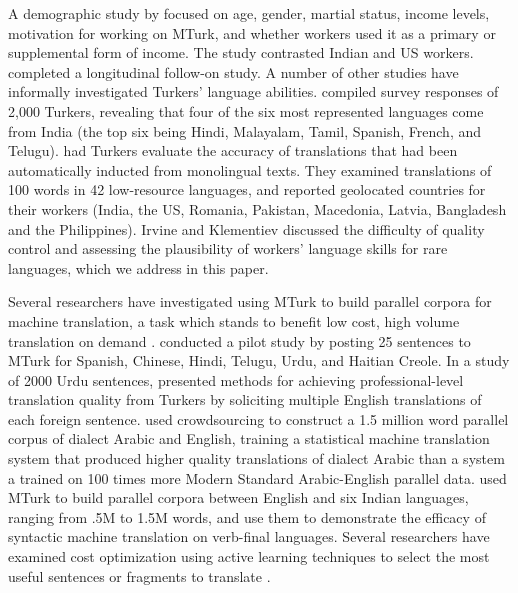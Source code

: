 \documentclass[11pt]{article}
\begin{document}
A demographic study by  focused on age, gender, martial status, income levels, motivation for working on MTurk, and whether workers used it as a primary or supplemental form of income.  The study contrasted Indian and US workers.  completed a longitudinal follow-on study. 
A number of other studies have informally investigated Turkers' language abilities.   compiled survey responses of 2,000 Turkers, revealing that four of the six most represented languages come from India (the top six being Hindi, Malayalam, Tamil, Spanish, French, and Telugu).   had Turkers evaluate the accuracy of translations that had been automatically inducted from monolingual texts.  They examined translations of 100 words in 42 low-resource languages, and reported geolocated countries for their workers (India, the US, Romania, Pakistan, Macedonia, Latvia, Bangladesh and the Philippines).  Irvine and Klementiev discussed the difficulty of quality control and assessing the plausibility of workers' language skills for rare languages, which we address in this paper. 

Several researchers have investigated using MTurk to build parallel corpora for machine translation, a task which stands to benefit low cost, high volume  translation on demand \cite{Germann2001}.   conducted a pilot study by posting 25 sentences to MTurk for Spanish, Chinese, Hindi, Telugu, Urdu, and Haitian Creole.  In a study of 2000 Urdu sentences, 
 presented methods for achieving professional-level translation quality from Turkers by soliciting multiple English translations of each foreign sentence. 
 used crowdsourcing to construct a 1.5 million word parallel corpus of dialect Arabic and English, training a statistical machine translation system that produced higher quality translations of dialect Arabic than a system a trained on 100 times more Modern Standard Arabic-English parallel data.   used MTurk to build parallel corpora between English and six Indian languages, ranging from .5M to 1.5M words, and use them to demonstrate the efficacy of syntactic machine translation on verb-final languages.  
Several researchers have examined cost optimization using active learning techniques to select the most useful sentences or fragments to translate \cite{ambati_naacl,bloodgood-callisonburch:2010:ACL,AmbatiThesis}.
\end{document}
